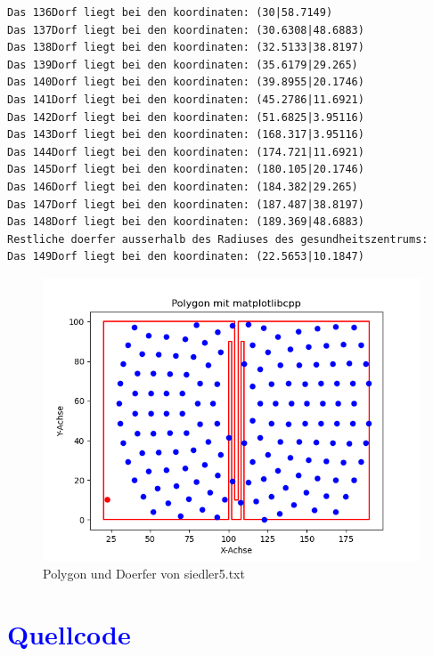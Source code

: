 \documentclass{article}
\begin{document}
\begin{verbatim}
Das 136Dorf liegt bei den koordinaten: (30|58.7149)
Das 137Dorf liegt bei den koordinaten: (30.6308|48.6883)
Das 138Dorf liegt bei den koordinaten: (32.5133|38.8197)
Das 139Dorf liegt bei den koordinaten: (35.6179|29.265)
Das 140Dorf liegt bei den koordinaten: (39.8955|20.1746)
Das 141Dorf liegt bei den koordinaten: (45.2786|11.6921)
Das 142Dorf liegt bei den koordinaten: (51.6825|3.95116)
Das 143Dorf liegt bei den koordinaten: (168.317|3.95116)
Das 144Dorf liegt bei den koordinaten: (174.721|11.6921)
Das 145Dorf liegt bei den koordinaten: (180.105|20.1746)
Das 146Dorf liegt bei den koordinaten: (184.382|29.265)
Das 147Dorf liegt bei den koordinaten: (187.487|38.8197)
Das 148Dorf liegt bei den koordinaten: (189.369|48.6883)
Restliche doerfer ausserhalb des Radiuses des gesundheitszentrums: 
Das 149Dorf liegt bei den koordinaten: (22.5653|10.1847)
\end{verbatim}
\newpage
\begin{figure}[h]
    \centering
    \includegraphics[width=1\textwidth]{Bilder/Figure_5.png}
    \caption{Polygon und Doerfer von siedler5.txt}
    \label{fig:example}
\end{figure}

\section{\textcolor{blue}{Quellcode}}
\end{document}
